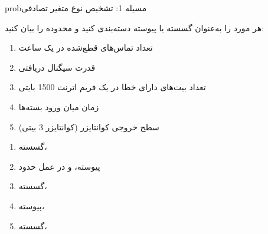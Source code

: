 
\begin{PSbox}[unbreakable]{prob}{مسیله 1: تشخیص نوع متغیر تصادفی}

هر مورد را به‌عنوان گسسته یا پیوسته دسته‌بندی کنید و محدوده را بیان کنید:

\begin{enumerate}
\def\labelenumi{(\alph{enumi})}
\tightlist
\item
  تعداد تماس‌های قطع‌شده در یک ساعت
\item
  قدرت سیگنال دریافتی 
\item
  تعداد بیت‌های دارای خطا در یک فریم اترنت 1500 بایتی
\item
  زمان میان ورود بسته‌ها
\item
  سطح خروجی کوانتایزر (کوانتایزر 3 بیتی)
\end{enumerate}

\PSsolution{} 

\begin{enumerate}
\def\labelenumi{(\alph{enumi})}
\tightlist
\item
  گسسته، 
\item
  پیوسته،  و در عمل حدود 
\item
  گسسته، 
\item
  پیوسته، \lr{T \ensuremath{\in} [0, \ensuremath{\infty})}
\item
  گسسته، 
\end{enumerate}

\end{PSbox}

